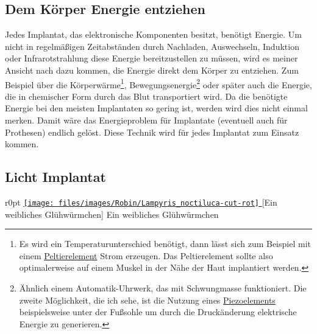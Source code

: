 \subsection{Dem Körper Energie entziehen}
Jedes Implantat, das elektronische Komponenten besitzt, benötigt Energie. Um nicht in regelmäßigen
Zeitabständen durch Nachladen, Auswechseln, Induktion oder Infrarotstrahlung diese Energie
bereitzustellen zu müssen, wird es meiner Ansicht nach dazu kommen, die Energie direkt dem Körper zu
entziehen. Zum Beispiel über die Körperwärme\footnote{Es wird ein Temperaturunterschied benötigt,
dann lässt sich zum Beispiel mit einem
\href{http://de.wikipedia.org/wiki/Peltier-Element}{Peltierelement} Strom erzeugen.
Das Peltierelement sollte also optimalerweise auf einem Muskel in der Nähe der Haut implantiert
werden.},
Bewegungsenergie\footnote{Ähnlich einem Automatik-Uhrwerk, das mit Schwungmasse funktioniert.
Die zweite Möglichkeit, die ich sehe, ist die Nutzung eines
\href{http://de.wikipedia.org/wiki/Piezoelement}{Piezoelements} beispielsweise unter der
Fußsohle um durch die Druckänderung elektrische Energie zu generieren.}%
oder später auch die Energie, die in chemischer Form
durch das Blut
transportiert wird. Da die benötigte Energie bei den meisten Implantaten so gering ist, werden wird
dies nicht einmal merken. Damit wäre das Energieproblem für Implantate (eventuell auch für Prothesen)
endlich gelöst.
Diese Technik wird für jedes Implantat zum Einsatz kommen.

\subsection{Licht Implantat}
\begin{wrapfigure}{r}{0pt}
	\href{http://de.wikipedia.org/w/index.php?title=Datei:Lampyris_noctiluca.jpg&filetimestamp=20050618231628}{%
		\texttt{[image: files/images/Robin/Lampyris\_noctiluca-cut-rot]}%
	}
	[Ein weibliches Glühwürmchen]%
		{Ein weibliches Glühwürmchen\footnotemark}%
	\label{fig:Firefly}
\end{wrapfigure}

